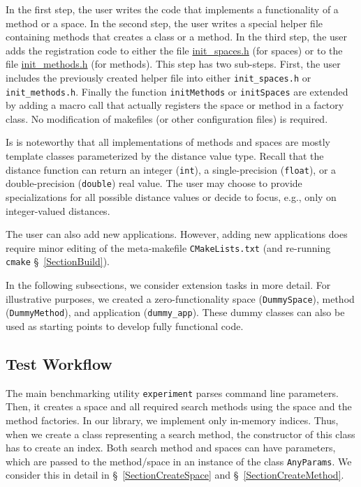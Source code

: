 \documentclass[runningheads,a4paper]{llncs}
\newcommand{\ttt}[1]{\texttt{#1}}
\begin{document}
{In the first step, the user writes the code that implements a
functionality of a method or a space.
In the second step, the user writes a special helper file  
containing methods that creates a class or a method.
In the third step, the user adds 
the registration code to either the file 
\href{https://github.com/searchivarius/NonMetricSpaceLib/blob/master/similarity_search/include/factory/init_spaces.h}{init\_spaces.h} (for spaces)
or to the file
\href{https://github.com/searchivarius/NonMetricSpaceLib/blob/master/similarity_search/include/factory/init_methods.h}{init\_methods.h} (for methods).
This step has two sub-steps. 
First, the user includes the previously created helper file into either
\texttt{init\_spaces.h} or \texttt{init\_methods.h}.
Finally the function \texttt{initMethods} or \texttt{initSpaces} are extended
by adding a macro call that actually registers the space or method in a factory class.
No modification of makefiles (or other configuration files) is required.

Is is noteworthy that all implementations of methods and spaces
are mostly template classes parameterized by the distance value type.
Recall that the distance function can return an integer (\ttt{int}), 
a single-precision (\ttt{float}), or a double-precision (\ttt{double}) real value.
The user may choose to provide specializations for all possible
distance values or decide to focus, e.g., only on integer-valued distances.

The user can also add new applications.
However, adding new applications does require minor editing of the meta-makefile \ttt{CMakeLists.txt} 
(and re-running \ttt{cmake} \S~\ref{SectionBuild}).

In the following subsections, 
we consider extension tasks in more detail.
For illustrative purposes,
we created a zero-functionality space (\texttt{DummySpace}), 
method (\texttt{DummyMethod}), and application (\texttt{dummy\_app}).
These dummy classes can also be used as starting points to develop fully functional code.

\subsection{Test Workflow}\label{SectionWorkflow}
The main benchmarking utility \ttt{experiment} parses command line parameters. 
Then, it creates a space and all required search methods using
the space and the method factories.
In our library, we implement only in-memory indices.
Thus, when we create a class representing a search method,
the constructor of this class has to create an index.
Both search method and spaces can have parameters,
which are passed to the method/space in an instance
of the class \ttt{AnyParams}.
We consider this in detail in \S~\ref{SectionCreateSpace} and \S~\ref{SectionCreateMethod}.

}
\end{document}
